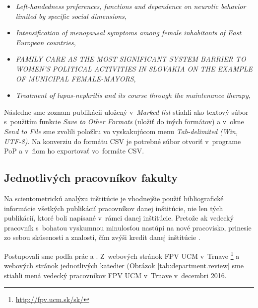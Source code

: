 \begin{itemize} 
  \item \emph{Left-handedness preferences, functions and dependence on neurotic
    behavior limited by specific social dimensions},
  \item \emph{Intensification of menopausal symptoms among female inhabitants
    of East European countries}, 
  \item \emph{FAMILY CARE AS THE MOST SIGNIFICANT SYSTEM BARRIER TO WOMEN'S
    POLITICAL ACTIVITIES IN SLOVAKIA ON THE EXAMPLE OF MUNICIPAL
    FEMALE-MAYORS},
  \item \emph{Treatment of lupus-nephritis and its course through the
    maintenance therapy},
\end{itemize}

Následne sme zoznam publikácii uložený v~\emph{Marked list} stiahli ako textový
súbor s~použitím funkcie \emph{Save to Other Formats} (uložiť do iných
formátov) a v~okne \emph{Send to File} sme zvolili položku vo vyskakujúcom menu
\emph{Tab-delimited (Win, UTF-8)}. Na konverziu do formátu CSV je potrebné
súbor otvoriť v~programe PoP \citep{Harzing2011} a v~ňom ho exportovať vo~formáte CSV.

\subsection{Jednotlivých pracovníkov fakulty}
\label{sec:staff.mining}

Na scientometrickú analýzu inštitúcie je vhodnejšie použiť bibliografické
informácie všetkých publikácií pracovníkov danej inštitúcie, nie len tých
publikácií, ktoré boli napísané v~rámci danej inštitúcie. Pretože ak vedecký
pracovník s~bohatou vyskumnou minulosťou nastúpi na nové pracovisko, prinesie
zo sebou skúsenosti a znalosti, čím zvýši kredit danej inštitúcie
\citep{Altanopoulou2012}. 

Postupovali sme podľa prác \citet{Kazakis2014a} a
\citet{Kazakis2014b,Kazakis2015}.  Z~webových stránok FPV UCM v~Trnave
\footnote{\url{http://fpv.ucm.sk/sk/}} a webových stránok jednotlivých katedier
(Obrázok \ref{tab:department.review} sme stiahli mená vedecký pracovníkov FPV UCM v~Trnave
v~decembri 2016.


